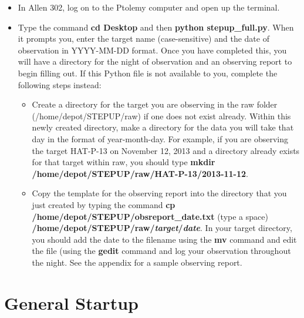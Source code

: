 \documentclass[11pt]{report}
\begin{document}
\begin{itemize}
\item In Allen 302, log on to the Ptolemy computer and open up the terminal.
\item Type the command {\bf cd Desktop} and then {\bf python stepup\_full.py}. When it prompts you, enter the target name (case-sensitive) and the date of observation in YYYY-MM-DD format. Once you have completed this, you will have a directory for the night of observation and an observing report to begin filling out. If this Python file is not available to you, complete the following steps instead:
\begin{itemize}
\item Create a directory for the target you are observing in the raw folder (/home/depot/STEPUP/raw) if one does not exist already. Within this newly created directory, make a directory for the data you will take that day in the format of year-month-day. For example, if you are observing the target HAT-P-13 on November 12, 2013 and a directory already exists for that target within raw, you should type {\bf mkdir /home/depot/STEPUP/raw/HAT-P-13/2013-11-12\bf}.
\item Copy the template for the observing report into the directory that you just created by typing the command {\bf cp /home/depot/STEPUP/obsreport\_date.txt\bf} (type a space) {\bf /home/depot/STEPUP/raw/\emph{target}/\emph{date}\bf}. In your target directory, you should add the date to the filename using the {\bf mv} command and edit the file (using the {\bf gedit} command and log your observation throughout the night. See the appendix for a sample observing report.
\end{itemize}
\end{itemize}
	
\section{General Startup} 
\end{document}
